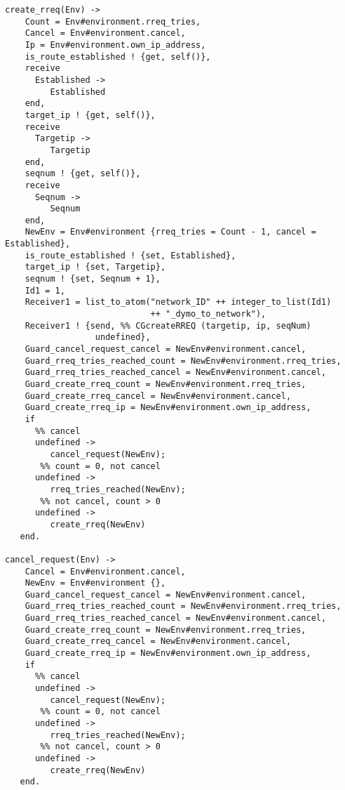 \begin{verbatim}
create_rreq(Env) -> 
    Count = Env#environment.rreq_tries,
    Cancel = Env#environment.cancel,
    Ip = Env#environment.own_ip_address,
    is_route_established ! {get, self()},
    receive 
      Established -> 
         Established
    end,
    target_ip ! {get, self()},
    receive 
      Targetip -> 
         Targetip
    end,
    seqnum ! {get, self()},
    receive 
      Seqnum -> 
         Seqnum
    end,
    NewEnv = Env#environment {rreq_tries = Count - 1, cancel = Established},
    is_route_established ! {set, Established},
    target_ip ! {set, Targetip},
    seqnum ! {set, Seqnum + 1},
    Id1 = 1,
    Receiver1 = list_to_atom("network_ID" ++ integer_to_list(Id1) 
                             ++ "_dymo_to_network"),
    Receiver1 ! {send, %% CGcreateRREQ (targetip, ip, seqNum)
                  undefined},
    Guard_cancel_request_cancel = NewEnv#environment.cancel,
    Guard_rreq_tries_reached_count = NewEnv#environment.rreq_tries,
    Guard_rreq_tries_reached_cancel = NewEnv#environment.cancel,
    Guard_create_rreq_count = NewEnv#environment.rreq_tries,
    Guard_create_rreq_cancel = NewEnv#environment.cancel,
    Guard_create_rreq_ip = NewEnv#environment.own_ip_address,
    if
      %% cancel
      undefined ->
         cancel_request(NewEnv);
       %% count = 0, not cancel
      undefined ->
         rreq_tries_reached(NewEnv);
       %% not cancel, count > 0
      undefined ->
         create_rreq(NewEnv)
   end.

cancel_request(Env) -> 
    Cancel = Env#environment.cancel,
    NewEnv = Env#environment {},
    Guard_cancel_request_cancel = NewEnv#environment.cancel,
    Guard_rreq_tries_reached_count = NewEnv#environment.rreq_tries,
    Guard_rreq_tries_reached_cancel = NewEnv#environment.cancel,
    Guard_create_rreq_count = NewEnv#environment.rreq_tries,
    Guard_create_rreq_cancel = NewEnv#environment.cancel,
    Guard_create_rreq_ip = NewEnv#environment.own_ip_address,
    if
      %% cancel
      undefined ->
         cancel_request(NewEnv);
       %% count = 0, not cancel
      undefined ->
         rreq_tries_reached(NewEnv);
       %% not cancel, count > 0
      undefined ->
         create_rreq(NewEnv)
   end.
\end{verbatim}
\normalsize